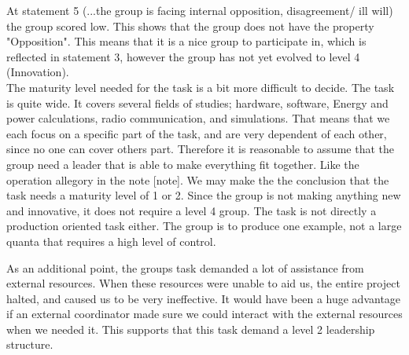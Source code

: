 	At statement 5 (...the group is facing internal opposition, disagreement/ ill will) the group scored low. This shows that the group does not have the property "Opposition". This means that it is a nice group to participate in, which is reflected in statement 3, however the group has not yet evolved to level 4 (Innovation).
\\	
The maturity level needed for the task is a bit more difficult to decide. The task is quite wide. It covers several fields of studies; hardware, software, Energy and power calculations, radio communication, and simulations. That means that we each focus on a specific part of the task, and are very dependent of each other, since no one can cover others part. Therefore it is reasonable to assume that the group need a leader that is able to make everything fit together. Like the operation allegory in the note [note]. We may make the the conclusion that the task needs a maturity level of 1 or 2. Since the group is not making anything new and innovative, it does not require a level 4 group. The task is not directly a production oriented task either. The group is to produce one example, not a large quanta that requires a high level of control. 

As an additional point, the groups task demanded a lot of assistance from external resources. When these resources were unable to aid us, the entire project halted, and caused us to be very ineffective. It would have been a huge advantage if an external coordinator made sure we could interact with the external resources when we needed it. This supports that this task demand a level 2 leadership structure. 